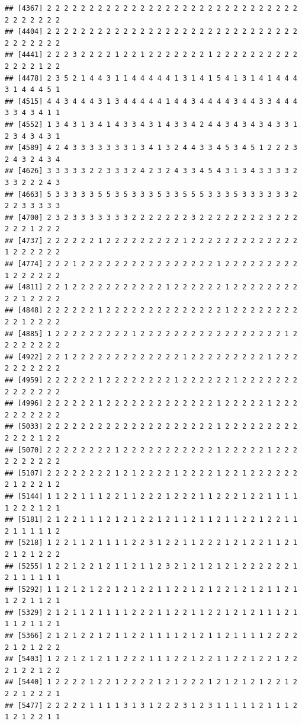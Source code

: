 \documentclass[
]{article}
\begin{document}
\begin{verbatim}
## [4367] 2 2 2 2 2 2 2 2 2 2 2 2 2 2 2 2 2 2 2 2 2 2 2 2 2 2 2 2 2 2 2 2 2 2 2 2 2
## [4404] 2 2 2 2 2 2 2 2 2 2 2 2 2 2 2 2 2 2 2 2 2 2 2 2 2 2 2 2 2 2 2 2 2 2 2 2 2
## [4441] 2 2 2 3 2 2 2 2 1 2 2 1 2 2 2 2 2 2 2 1 2 2 2 2 2 2 2 2 2 2 2 2 2 2 1 2 2
## [4478] 2 3 5 2 1 4 4 3 1 1 4 4 4 4 4 1 3 1 4 1 5 4 1 3 1 4 1 4 4 4 3 1 4 4 4 5 1
## [4515] 4 4 3 4 4 4 3 1 3 4 4 4 4 4 1 4 4 3 4 4 4 4 3 4 4 3 3 4 4 4 3 3 4 3 4 1 1
## [4552] 1 3 4 3 1 3 4 1 4 3 3 4 3 1 4 3 3 4 2 4 4 3 4 3 4 3 4 3 3 1 2 3 4 3 4 3 1
## [4589] 4 2 4 3 3 3 3 3 3 3 1 3 4 1 3 2 4 4 3 3 4 5 3 4 5 1 2 2 2 3 2 4 3 2 4 3 4
## [4626] 3 3 3 3 3 2 2 3 3 3 2 4 2 3 2 4 3 3 4 5 4 3 1 3 4 3 3 3 3 2 3 3 2 2 2 4 3
## [4663] 5 3 3 3 3 3 5 5 3 5 3 3 3 5 3 3 5 5 5 3 3 3 5 3 3 3 3 3 3 2 2 2 3 3 3 3 3
## [4700] 2 3 2 3 3 3 3 3 3 3 2 2 2 2 2 2 2 3 2 2 2 2 2 2 2 2 3 2 2 2 2 2 2 1 2 2 2
## [4737] 2 2 2 2 2 2 1 2 2 2 2 2 2 2 2 2 1 2 2 2 2 2 2 2 2 2 2 2 2 2 1 2 2 2 2 2 2
## [4774] 2 2 2 1 2 2 2 2 2 2 2 2 2 2 2 2 2 2 2 2 1 2 2 2 2 2 2 2 2 2 1 2 2 2 2 2 2
## [4811] 2 2 1 2 2 2 2 2 2 2 2 2 2 2 1 2 2 2 2 2 2 1 2 2 2 2 2 2 2 2 2 2 1 2 2 2 2
## [4848] 2 2 2 2 2 2 1 2 2 2 2 2 2 2 2 2 2 2 2 2 2 1 2 2 2 2 2 2 2 2 2 2 1 2 2 2 2
## [4885] 1 2 2 2 2 2 2 2 2 2 1 2 2 2 2 2 2 2 2 2 2 2 2 2 2 2 2 2 1 2 2 2 2 2 2 2 2
## [4922] 2 2 1 2 2 2 2 2 2 2 2 2 2 2 2 2 1 2 2 2 2 2 2 2 2 2 1 2 2 2 2 2 2 2 2 2 2
## [4959] 2 2 2 2 2 2 1 2 2 2 2 2 2 2 2 1 2 2 2 2 2 2 1 2 2 2 2 2 2 2 2 2 2 2 2 2 2
## [4996] 2 2 2 2 2 2 1 2 2 2 2 2 2 2 2 2 2 2 2 2 1 2 2 2 2 2 1 2 2 2 2 2 2 2 2 2 2
## [5033] 2 2 2 2 2 2 2 2 2 2 2 2 2 2 2 2 2 2 2 2 1 2 2 2 2 2 2 2 2 2 2 2 2 2 1 2 2
## [5070] 2 2 2 2 2 2 2 2 1 2 2 2 2 2 2 2 2 2 2 2 1 2 2 2 2 2 1 2 2 2 2 2 2 2 2 2 2
## [5107] 2 2 2 2 2 2 2 2 1 2 1 2 2 2 2 1 2 2 2 2 1 2 2 1 2 2 2 2 2 2 2 1 2 2 2 1 2
## [5144] 1 1 2 2 1 1 1 2 2 1 1 2 2 2 1 2 2 2 1 1 2 2 2 1 2 2 1 1 1 1 1 2 2 2 1 2 1
## [5181] 2 1 2 2 1 1 1 2 1 2 1 2 2 1 2 1 1 2 1 1 2 1 1 2 2 1 2 2 1 1 2 1 1 1 1 1 2
## [5218] 1 2 2 1 1 2 1 1 1 1 2 2 3 1 2 2 1 1 2 2 2 1 2 1 2 2 1 1 2 1 2 1 2 1 2 2 2
## [5255] 1 2 2 1 2 2 1 2 1 1 2 1 1 2 3 2 1 2 1 2 1 2 1 2 2 2 2 2 2 1 2 1 1 1 1 1 1
## [5292] 1 1 2 1 2 1 2 2 1 2 1 2 2 1 1 2 2 1 2 1 2 2 1 2 1 2 1 1 2 1 1 2 2 1 1 2 1
## [5329] 2 1 2 1 1 2 1 1 1 1 2 2 2 1 1 2 2 1 1 2 2 1 2 1 2 1 1 1 2 1 1 1 2 1 1 2 1
## [5366] 2 1 2 1 2 2 1 2 1 1 2 2 1 1 1 1 2 1 2 1 1 2 1 1 1 1 2 2 2 2 2 1 2 1 2 2 2
## [5403] 1 2 2 1 2 1 2 1 1 2 2 2 1 1 1 2 2 1 2 2 1 1 2 2 1 2 2 1 2 2 2 1 2 2 1 2 2
## [5440] 1 2 2 2 2 1 2 2 1 2 2 2 2 1 2 1 2 2 2 1 2 1 2 1 2 1 2 2 1 2 2 2 1 2 2 2 1
## [5477] 2 2 2 2 2 1 1 1 1 3 1 3 1 2 2 2 3 1 2 3 1 1 1 1 1 2 1 1 1 2 1 2 1 2 2 1 1

\end{verbatim}
\end{document}
